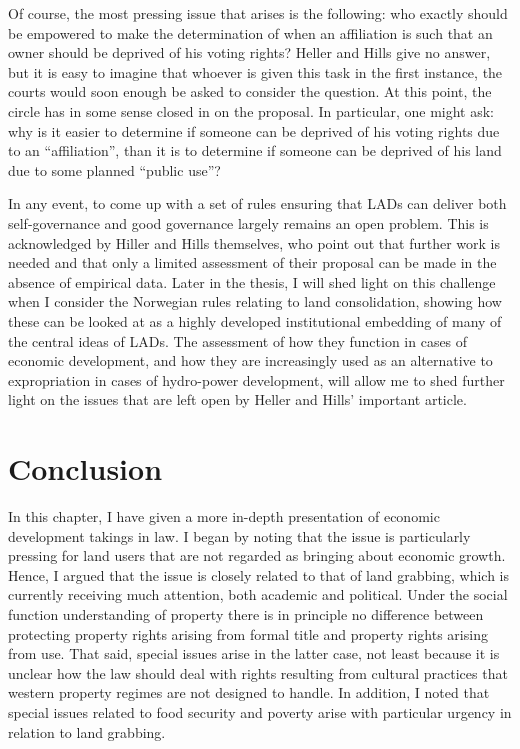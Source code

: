 \documentclass[12pt,a4paper]{book} %
\begin{document}
Of course, the most pressing issue that arises is the following: who exactly should be empowered to make the determination of when an affiliation is such that an owner should be deprived of his voting rights? Heller and Hills give no answer, but it is easy to imagine that whoever is given this task in the first instance, the courts would soon enough be asked to consider the question. At this point, the circle has in some sense closed in on the proposal. In particular, one might ask: why is it easier to determine if someone can be deprived of his voting rights due to an ``affiliation'', than it is to determine if someone can be deprived of his land due to some planned ``public use''?

In any event, to come up with a set of rules ensuring that LADs can deliver both self-governance and good governance largely remains an open problem. This is acknowledged by Hiller and Hills themselves, who point out that further work is needed and that only a limited assessment of their proposal can be made in the absence of empirical data. Later in the thesis, I will shed light on this challenge when I consider the Norwegian rules relating to land consolidation, showing how these can be looked at as a highly developed institutional embedding of many of the central ideas of LADs. The assessment of how they function in cases of economic development, and how they are increasingly used as an alternative to expropriation in cases of hydro-power development, will allow me to shed further light on the issues that are left open by Heller and Hills' important article.

\section{Conclusion}

In this chapter, I have given a more in-depth presentation of economic development takings in law. I began by noting that the issue is particularly pressing for land users that are not regarded as bringing about economic growth. Hence, I argued that the issue is closely related to that of land grabbing, which is currently receiving much attention, both academic and political. Under the social function understanding of property there is in principle no difference between protecting property rights arising from formal title and property rights arising from use. That said, special issues arise in the latter case, not least because it is unclear how the law should deal with rights resulting from cultural practices that western property regimes are not designed to handle. In addition, I noted that special issues related to food security and poverty arise with particular urgency in relation to land grabbing.
\end{document}
